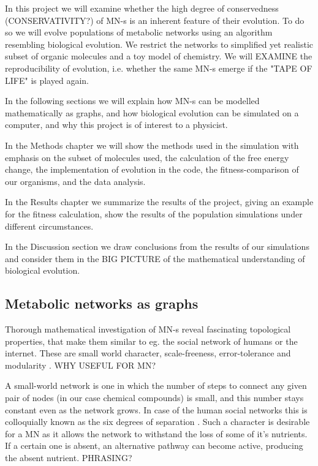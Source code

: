 \documentclass[10pt,a4paper]{article}
\begin{document}
	In this project we will examine whether the high degree of conservedness (CONSERVATIVITY?) of MN-s is an inherent feature of their evolution. To do so we will evolve populations of metabolic networks using an algorithm resembling biological evolution. We restrict the networks to simplified yet realistic subset of organic molecules and a toy model of chemistry. We will EXAMINE the reproducibility of evolution, i.e. whether the same MN-s emerge if the "TAPE OF LIFE" is played again. 

	In the following sections we will explain how MN-s can be modelled mathematically as graphs, and how biological evolution can be simulated on a computer, and why this project is of interest to a physicist.

	In the Methods chapter we  will show the methods used in the simulation with emphasis on the subset of molecules used, the calculation of the free energy change, the implementation of evolution in the code, the fitness-comparison of our organisms, and the data analysis. 

	In the Results chapter we summarize the results of the project, giving an example for the fitness calculation, show the results of the population simulations under different circumstances.


	In the Discussion section we draw conclusions from the results of our simulations and consider them in the BIG PICTURE of the mathematical understanding of biological evolution. 

	
	\subsection{Metabolic networks as graphs}
	Thorough mathematical investigation of MN-s reveal fascinating topological properties, that make them similar to eg. the social network of humans or the internet. These are small world character, scale-freeness, error-tolerance \cite{largescale} and modularity . WHY USEFUL FOR MN?
	
	A small-world network \cite{smallworld} is one in which the number of steps to connect any given pair of nodes (in our case chemical compounds) is small, and this number stays constant even as the network grows. In case of the human social networks this is colloquially known as the six degrees of separation \cite{sixdegrees}. Such a character is desirable for a MN as it allows the network to withstand the loss of some of it's nutrients. If a certain one is absent, an alternative pathway can become active, producing the absent nutrient. PHRASING? 
	 
\end{document}
